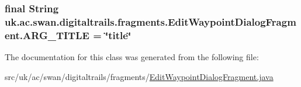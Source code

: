 \hypertarget{classuk_1_1ac_1_1swan_1_1digitaltrails_1_1fragments_1_1_edit_waypoint_dialog_fragment_aad3e47036a77df27ad107a61bffcad9b}{
\subsubsection[{A\+R\+G\+\_\+\+T\+I\+T\+L\+E}]{\setlength{\rightskip}{0pt plus 5cm}final String uk.\+ac.\+swan.\+digitaltrails.\+fragments.\+Edit\+Waypoint\+Dialog\+Fragment.\+A\+R\+G\+\_\+\+T\+I\+T\+L\+E = \char`\"{}title\char`\"{}\hspace{0.3cm}{\ttfamily [static]}}}\label{classuk_1_1ac_1_1swan_1_1digitaltrails_1_1fragments_1_1_edit_waypoint_dialog_fragment_aad3e47036a77df27ad107a61bffcad9b}


The documentation for this class was generated from the following file\+:\begin{DoxyCompactItemize}
\item 
src/uk/ac/swan/digitaltrails/fragments/\hyperlink{_edit_waypoint_dialog_fragment_8java}{Edit\+Waypoint\+Dialog\+Fragment.\+java}\end{DoxyCompactItemize}
